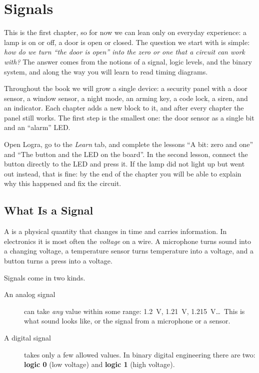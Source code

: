 \chapter{Signals}
\label{ch:signals}

This is the first chapter, so for now we can lean only on everyday
experience: a lamp is on or off, a door is open or closed. The question we
start with is simple: \emph{how do we turn ``the door is open'' into the zero
or one that a circuit can work with?} The answer comes from the notions of a
signal, logic levels, and the binary system, and along the way you will learn
to read timing diagrams.

\begin{infobox}
Throughout the book we will grow a single device: a security panel with a door
sensor, a window sensor, a night mode, an arming key, a code lock, a siren,
and an indicator. Each chapter adds a new block to it, and after every
chapter the panel still works. The first step is the smallest one: the door
sensor as a single bit and an ``alarm'' LED.
\end{infobox}

\begin{buildbox}
Open Logra, go to the \emph{Learn} tab, and complete the lessons ``A bit:
zero and one'' and ``The button and the LED on the board''. In the second
lesson, connect the button directly to the LED and press it. If the lamp did
not light up but went out instead, that is fine: by the end of the chapter you
will be able to explain why this happened and fix the circuit.
\end{buildbox}

\section{What Is a Signal}

A  is a physical quantity that changes in time and carries
information. In electronics it is most often the \emph{voltage} on a wire. A
microphone turns sound into a changing voltage, a temperature sensor turns
temperature into a voltage, and a button turns a press into a voltage.

Signals come in two kinds.

\begin{description}
  \item[An analog signal] can take \emph{any} value within some range: 1.2~V,
    1.21~V, 1.215~V\ldots\ This is what sound looks like, or the signal from a
    microphone or a sensor.
  \item[A digital signal] takes only a few allowed values. In binary digital
    engineering there are two: \textbf{logic 0} (low voltage) and
    \textbf{logic 1} (high voltage).
\end{description}

